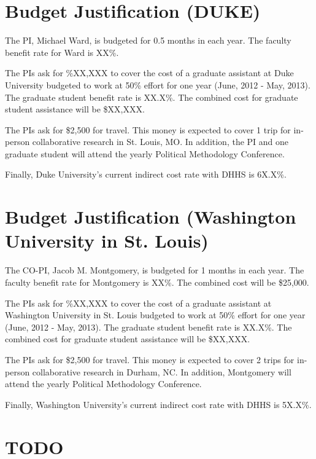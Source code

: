 \documentclass[pdftex,12pt,fullpage,oneside]{amsart}
\begin{document}
\section*{Budget Justification (DUKE)}

The PI, Michael Ward, is budgeted for 0.5 months in each year.  The
faculty benefit rate for Ward is XX\%.   

The PIs ask for \%XX,XXX to cover the cost of a graduate assistant at
Duke University budgeted to work at 50\% effort for one year (June,
2012 - May, 2013).  The graduate student benefit rate is XX.X\%.  The
combined cost for graduate student assistance will be \$XX,XXX.

The PIs ask for \$2,500 for travel.  This money is expected to cover 1
trip for in-person collaborative research in St. Louis, MO.  In addition,
the PI and one graduate student will attend the yearly Political
Methodology Conference.

Finally, Duke University's current indirect cost rate with DHHS is 6X.X\%.



\newpage
\setcounter{page}{1}
\thispagestyle{empty}

\section*{Budget Justification (Washington University in St. Louis)}

The CO-PI, Jacob M. Montgomery, is budgeted for 1 months in each year.  The
faculty benefit rate for Montgomery is XX\%.   The combined cost will
be \$25,000.

The PIs ask for \%XX,XXX to cover the cost of a graduate assistant at
Washington University in St. Louis budgeted to work at 50\% effort for one year
(June, 2012 - May, 2013).  The graduate student benefit rate is
XX.X\%.  The combined cost for graduate student assistance will be
\$XX,XXX.

The PIs ask for \$2,500 for travel.  This money is expected to cover 2
trips for in-person collaborative research in Durham, NC.  In
addition, Montgomery will attend the yearly Political Methodology
Conference.

Finally, Washington University's current indirect cost rate with DHHS is 5X.X\%.

\newpage
\setcounter{page}{1}
\section*{TODO}
\end{document}
